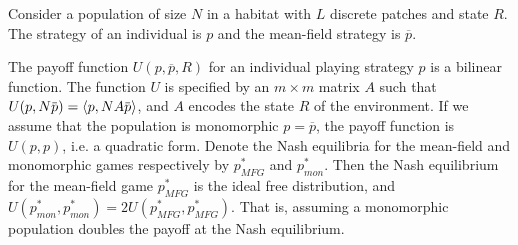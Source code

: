 \begin{proposition}
  \label{prop:doubleup}

  Consider a population of size $N$ in a habitat with $L$ discrete patches and state $R$. The strategy of an individual is $p$ and the mean-field strategy is $\overbar{p}$.

  The payoff function $U(p,\overbar{p}, R)$ for an individual playing strategy $p$ is a bilinear function. The function $U$ is specified by an $m\times m$ matrix $A$ such that $U(p,N\overbar{p}) = \ip{p}{N A \overbar{p}}$, and $A$ encodes the state $R$ of the environment. If we assume that the population is monomorphic $p = \overbar{p}$, the payoff function is $U(p,p)$, i.e. a quadratic form. Denote the Nash equilibria for the mean-field and monomorphic games respectively by $p^*_{MFG}$ and $p^*_{mon}$. Then the Nash equilibrium for the mean-field game $p^*_{MFG}$ is the ideal free distribution, and $U(p^*_{mon}, p^*_{mon}) = 2U(p^*_{MFG},p^*_{MFG})$. That is, assuming a monomorphic population doubles the payoff at the Nash equilibrium.
\end{proposition}
